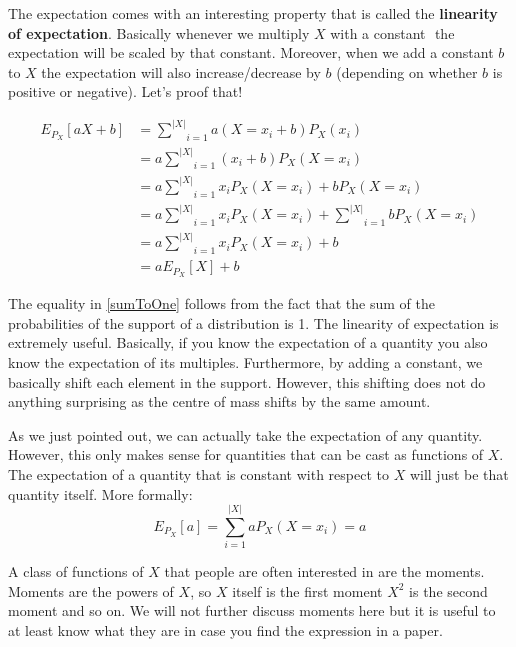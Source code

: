 \documentclass[a4paper,11pt,leqno]{report}
\begin{document}
The expectation comes with an interesting property that is called the \textbf{linearity of expectation}. Basically whenever
we multiply $ X $ with a constant $  $ the expectation will be scaled by that constant. Moreover, when we add a constant $ b $
to $ X $ the expectation will also increase/decrease by $ b $ (depending on whether $ b $ is positive or negative). Let's
proof that!

\begin{align}
E_{P_{X}}[aX+b] &= \underset{i = 1}{\overset{|X|}{\sum}} a(X=x_{i}+b) P_{X}(x_{i}) \\
&= a \underset{i = 1}{\overset{|X|}{\sum}} (x_{i}+b) P_{X}(X= x_{i}) \\
&= a \underset{i = 1}{\overset{|X|}{\sum}} x_{i}P_{X}(X=x_{i})+bP_{X}(X=x_{i}) \\
&= a \underset{i = 1}{\overset{|X|}{\sum}} x_{i}P_{X}(X=x_{i}) + \underset{i = 1}{\overset{|X|}{\sum}}bP_{X}(X=x_{i}) \\
&= a \underset{i = 1}{\overset{|X|}{\sum}} x_{i}P_{X}(X=x_{i}) + b \label{sumToOne} \\
&= a E_{P_{X}}[X]+b 
\end{align}

The equality in \ref{sumToOne} follows from the fact that the sum of the probabilities of the support of a distribution is 1.
The linearity of expectation is extremely useful. Basically, if you know the expectation of a quantity you also know the 
expectation of its multiples. Furthermore, by adding a constant, we basically shift each element in the support. However, this shifting
does not do anything surprising as the centre of mass shifts by the same amount.

As we just pointed out, we can actually take the expectation of any quantity. However, this only makes sense for quantities that
can be cast as functions of $ X $. The expectation of a quantity that is constant with respect to $ X $ will just be that
quantity itself. More formally:
\begin{equation}
E_{P_{X}}[a] = \underset{i = 1}{\overset{|X|}{\sum}} aP_{X}(X=x_{i}) = a
\end{equation}

A class of functions of $ X $ that people are often interested in are the moments. Moments are the powers of $ X $, so $ X $ itself
is the first moment $ X^{2} $ is the second moment and so on. We will not further discuss moments here but it is useful to at
least know what they are in case you find the expression in a paper.
\end{document}
